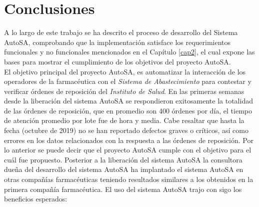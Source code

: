 \chapter{Conclusiones}\label{cap5}

A lo largo de este trabajo se ha descrito el proceso de desarrollo del Sistema AutoSA, comprobando que la implementación satisface los requerimientos funcionales y no funcionales mencionados en el Capítulo \ref{cap2}, el cual expone las bases para mostrar el cumplimiento de los objetivos del proyecto AutoSA.\\
El objetivo principal del proyecto AutoSA, es automatizar la interacción de los operadores de la farmacéutica con el \textit{Sistema de Abastecimiento} para contestar y verificar órdenes de reposición del \textit{Instituto de Salud}. En las primeras semanas desde la liberación del sistema AutoSA se respondieron exitosamente la totalidad de las órdenes de reposición, que en promedio son 400 órdenes por día, el tiempo de atención promedio por lote fue de hora y media. Cabe resaltar que hasta la fecha (octubre de 2019) no se han reportado defectos graves o críticos, así como errores en los datos relacionados con la respuesta a las órdenes de reposición. Por lo anterior se puede decir que el proyecto AutoSA cumple con el objetivo para el cuál fue propuesto. Posterior a la liberación del sistema AutoSA la consultora dueña del desarrollo del sistema AutoSA ha implantado el sistema AutoSA en otras compañías farmacéuticas teniendo resultados similares a los obtenidos en la primera compañía farmacéutica. El uso del sistema AutoSA trajo con sigo los beneficios esperados:
